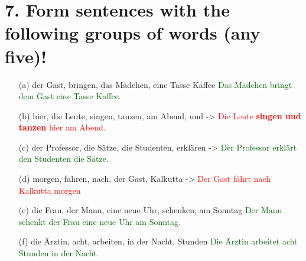 \documentclass{article}
\begin{document}
\section*{7. Form sentences with the following groups of words (any five)!}
\begin{enumerate}
    \item[(a)] der Gast, bringen, das Mädchen, eine Tasse Kaffee \textcolor{darkgreen}{Das Mädchen bringt dem Gast eine Tasse Kaffee.}
    \item[(b)] hier, die Leute, singen, tanzen, am Abend, und -> \textcolor{red}{Die Leute \textbf{singen und tanzen} hier am Abend.}
    \item[(c)] der Professor, die Sätze, die Studenten, erklären -> \textcolor{darkgreen}{Der Professor erklärt den Studenten die Sätze.}
    \item[(d)] morgen, fahren, nach, der Gast, Kalkutta -> \textcolor{red}{Der Gast fährt nach Kalkutta morgen}
    \item[(e)] die Frau, der Mann, eine neue Uhr, schenken, am Sonntag \textcolor{darkgreen}{Der Mann schenkt der Frau eine neue Uhr am Sonntag.}
    \item[(f)] die Ärztin, acht, arbeiten, in der Nacht, Stunden \textcolor{darkgreen}{Die Ärztin arbeitet acht Stunden in der Nacht.}
\end{enumerate}
\end{document}
